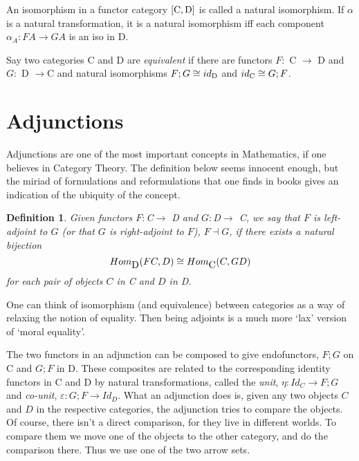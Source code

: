 \documentclass{article}
\newtheorem{definition}{Definition}
\begin{document}
An isomorphism in a functor category $[{\rm C,D}]$ is called a natural
isomorphism. If $\alpha$ is a natural transformation, it is a natural
isomorphism iff each component $\alpha_A\colon FA\to GA$ is an iso in D.

Say two categories C and D are {\em equivalent} if there are functors
$F\colon$ C $\to $ D and $G\colon$ D $\to $C and natural isomorphisms
$F;G\cong id_{\rm D}$ and $id_{\rm C}\cong G;F$.

\section{Adjunctions}
Adjunctions are one of the most important concepts in Mathematics, if one believes in Category Theory. The definition below seems innocent enough, but the miriad of formulations and reformulations that one finds in books gives an indication of the ubiquity of the concept.
\begin{definition} Given   functors
$F\colon$C$\to$ D and $G\colon$D$\to$ C,
we say that $F$ is {\em left-adjoint}
to $G$ 
(or that $G$ is right-adjoint to $F$),
$F \dashv G$, if there exists a natural bijection
$$Hom_{\mbox D}(FC,D)\cong Hom_{\mbox C}(C,GD)$$
for each pair of objects $C$ in  C and  $D$ in D.
\end{definition}
One can think of isomorphism (and equivalence) between categories as a way of relaxing the notion of equality. Then being adjoints is a much more `lax' version of `moral equality'.

The two functors in an adjunction can be composed to give endofunctors, $F;G$ on C and $G;F$ in D. These composites are related to the corresponding identity
functors in C and D by natural transformations, called the \textit{unit}, $\eta\colon Id_C\to F;G$ and \textit{co-unit}, $\varepsilon\colon G;F\to Id_D$. What an adjunction does is, given any two objects $C$ and $D$ in the respective categories, the adjunction tries to  compare the objects. %
Of  course,
there isn't a direct comparison, for they live in different worlds. To compare them we move one of the objects to the other category, and do the
comparison there. Thus we use one of the two arrow sets. %
\end{document}

